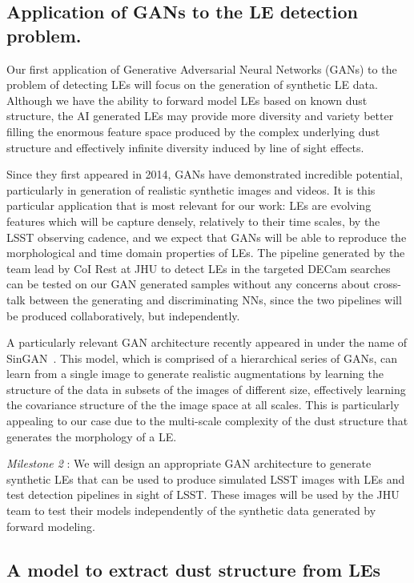 \documentclass{proposalnsf}
\begin{document}
\subsection{Application of GANs to the LE detection problem.}

Our first application of Generative Adversarial Neural Networks (GANs) to the problem of detecting LEs will focus on the generation of synthetic LE data. Although we have the ability to forward model LEs based on known dust structure, the AI generated LEs may provide more diversity and variety better filling the enormous feature space produced by the complex underlying dust structure and effectively infinite diversity induced by line of sight effects.

Since they first appeared in 2014, GANs have demonstrated incredible potential, particularly in  generation of realistic synthetic images and videos. It is this particular application that is most relevant for our work: LEs are evolving features which will be capture densely, relatively to their time scales, by the LSST observing cadence,  and we expect that GANs will be able to reproduce the morphological and time domain properties of LEs. The pipeline generated by the team lead by CoI Rest at JHU to detect LEs in the targeted DECam searches can be tested on our GAN generated samples without any concerns about cross-talk between the generating and discriminating NNs, since the two pipelines will be produced collaboratively, but independently.

A particularly relevant GAN architecture recently appeared in under the name of SinGAN~\citep{shaham2019singan}. This model, which is comprised of a hierarchical series of GANs, can learn from a single image to generate realistic augmentations by learning the structure of the data in subsets of the images of different size, effectively learning the covariance structure of the the image space at all scales. This is particularly appealing to our case due to the multi-scale complexity of the dust structure that generates the morphology of a LE.

\emph{Milestone 2} : We will design an appropriate GAN architecture to generate synthetic LEs that can be used to produce simulated LSST images with LEs and test detection pipelines in sight of LSST. These images will be used by the JHU team to test their models independently of the synthetic data generated by forward modeling.

\subsection{A model to extract dust structure from LEs}
\end{document}
